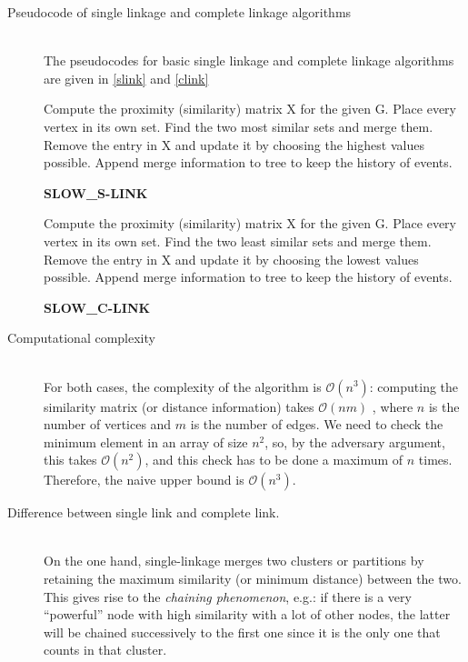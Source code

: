 \documentclass[12pt,a4paper]{article}
\begin{document}
\begin{description}
\item[Pseudocode of single linkage and complete linkage algorithms] \hfill
  \\
  The pseudocodes for basic single linkage and complete linkage
  algorithms are given in \ref{slink} and \ref{clink}
  \begin{algorithm}[h]
    \SetAlgoLined

    \nl Compute the proximity (similarity) matrix X for the given G.\;
    \nl Place every vertex in its own set.\;
    \nl Find the two most similar sets and merge them.\;
    \nl Remove the entry in X and update it by choosing the highest
    values possible.\;
    \nl Append merge information to tree to keep the history of events.\;
    \nl {}
    \caption{\bf SLOW\_S-LINK}
    \label{slink}
  \end{algorithm}

  \begin{algorithm}[h]
    \SetAlgoLined

    \nl Compute the proximity (similarity) matrix X for the given G.\;
    \nl Place every vertex in its own set.\;
    \nl Find the two least similar sets and merge them.\;
    \nl Remove the entry in X and update it by choosing the lowest
    values possible.\;
    \nl Append merge information to tree to keep the history of events.\;
    \nl {}
    \caption{\bf SLOW\_C-LINK}
    \label{clink}
  \end{algorithm}

\item[Computational complexity] \hfill \\

  For both cases, the complexity of the algorithm is
  $\mathcal{O}(n^3)$: computing the similarity matrix (or distance
  information) takes $\mathcal{O}(nm)$ \cite{newman}, where $n$ is the
  number of vertices and $m$ is the number of edges. We need to check
  the minimum element in an array of size $n^2$, so, by the adversary
  argument, this takes $\mathcal{O}(n^2)$, and this check has to be
  done a maximum of $n$ times. Therefore, the naive upper bound is
  $\mathcal{O}(n^3)$.

\item[Difference between single link and complete link.] \hfill \\
  On the one hand, single-linkage merges two clusters or partitions by
  retaining the maximum similarity (or minimum distance) between the
  two. This gives rise to the \emph{chaining phenomenon}, e.g.: if
  there is a very ``powerful'' node with high similarity with a lot of
  other nodes, the latter will be chained successively to the first
  one since it is the only one that counts in that cluster.


\end{description}
\end{document}

